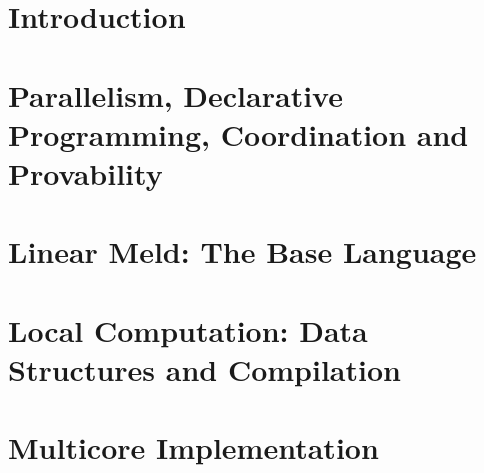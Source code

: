 \documentclass[12pt]{cmuthesis}
\theoremstyle{indented}
\begin{document}

\thispagestyle{empty}
\clearpage

\frontmatter
\begin{abstract}

\end{abstract}

\begin{acknowledgments}

\end{acknowledgments}

\tableofcontents
\listoffigures
\listoftables
\renewcommand{\listtheoremname}{List of Equations}
\listoftheorems

\mainmatter


%
%
%
%
%

\mainmatter
\chapter{Introduction}


\chapter{Parallelism, Declarative Programming, Coordination and Provability}


\chapter{Linear Meld: The Base Language}



\chapter{Local Computation: Data Structures and Compilation}\label{chapter:local}

\chapter{Multicore Implementation}\label{chapter:implementation}

\end{document}
